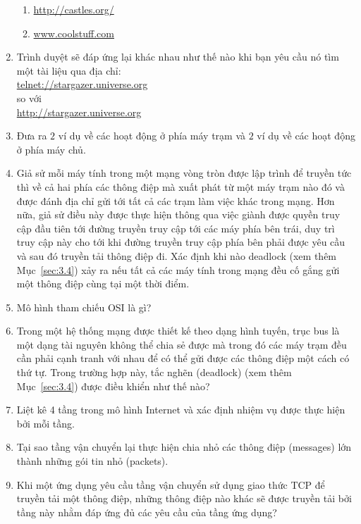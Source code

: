 \begin{multicols}{2}
\begin{enumerate}
\begin{enumerate}
    \item \url{http://castles.org/} 

    \item \url{www.coolstuff.com}
    \end{enumerate}

  \item Trình duyệt sẽ đáp ứng lại khác nhau như thế nào khi bạn yêu cầu nó tìm một tài
    liệu qua địa chỉ:\\
    \url{telnet://stargazer.universe.org} \\
    so với \\
    \url{http://stargazer.universe.org }

  \item Đưa ra $2$ ví dụ về các hoạt động ở phía máy trạm và $2$ ví dụ về các hoạt động ở
    phía máy chủ.

  \item Giả sử mỗi máy tính trong một mạng vòng tròn được lập trình để truyền tức thì về
    cả hai phía các thông điệp mà xuất phát từ một máy trạm nào đó và được đánh địa chỉ
    gửi tới tất cả các trạm làm việc khác trong mạng. Hơn nữa, giả sử điều này được thực
    hiện thông qua việc giành được quyền truy cập đầu tiên tới đường truyền truy cập tới
    các máy phía bên trái, duy trì truy cập này cho tới khi đường truyền truy cập phía bên
    phải được yêu cầu và sau đó truyền tải thông điệp đi. Xác định khi nào
    \textup{deadlock} (xem thêm Mục~\ref{sec:3.4}) xảy ra nếu tất cả các máy tính trong
    mạng đều cố gắng gửi một thông điệp cùng tại một thời điểm.


  \item Mô hình tham chiếu OSI là gì?

  \item Trong một hệ thống mạng được thiết kế theo dạng hình tuyến, trục bus là một dạng
    tài nguyên không thể chia sẻ được mà trong đó các máy trạm đều cần phải cạnh tranh với
    nhau để có thể gửi được các thông điệp một cách có thứ tự. Trong trường hợp này, tắc
    nghẽn (deadlock) (xem thêm Mục~\ref{sec:3.4}) được điều khiển như thế nào?

  \item Liệt kê 4 tầng trong mô hình Internet và xác định nhiệm vụ được thực hiện bởi mỗi
    tầng.

  \item Tại sao tầng vận chuyển lại thực hiện chia nhỏ các thông điệp (messages) lớn thành
    những gói tin nhỏ (packets).

  \item Khi một ứng dụng yêu cầu tầng vận chuyển sử dụng giao thức TCP để truyền tải một
    thông điệp, những thông điệp nào khác sẽ được truyền tải bởi tầng này nhằm đáp ứng đủ
    các yêu cầu của tầng ứng dụng?


\end{enumerate}
\end{multicols}
